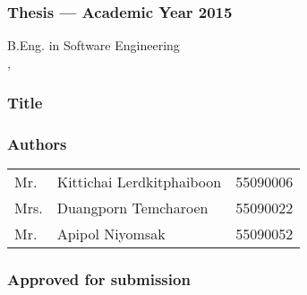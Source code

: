 \thispagestyle{empty}

\begin{flushleft}
\subsubsection{\Large{Thesis --- Academic Year 2015}}
B.Eng. in Software Engineering \\
\IC, \kmitl

\vspace{2cm}

\subsubsection{\Large{Title}}
\dms

\vspace{1cm}
\subsubsection{\Large{Authors}}
\begin{tabular}{lll}
Mr. & Kittichai Lerdkitphaiboon & 55090006 \\
Mrs. & Duangporn Temcharoen & 55090022 \\
Mr. & Apipol Niyomsak & 55090052
\end{tabular}
\end{flushleft}

\vfill

\begin{flushright}
\subsubsection{\Large{Approved for submission}}
\vspace{1cm}
\vspace{1cm}
 \\
\vspace{1cm}
 \\
\end{flushright}